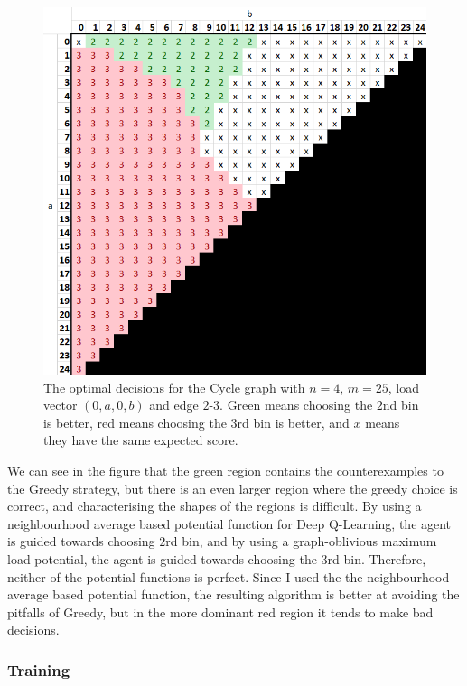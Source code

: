 \begin{figure}[h!] \label{greedy-counterexample-analysed}
    \centering
    \includegraphics[scale=1.0]{Chapter4/Figs/0a0b_4_25_analysis.png}
    \caption{The optimal decisions for the Cycle graph with $n=4$, $m=25$, load vector $(0,a,0,b)$ and edge $2$-$3$. Green means choosing the $2$nd bin is better, red means choosing the $3$rd bin is better, and $x$ means they have the same expected score.}
\end{figure}


We can see in the figure that the green region contains the counterexamples to the Greedy strategy, but there is an even larger region where the greedy choice is correct, and characterising the shapes of the regions is difficult. By using a neighbourhood average based potential function for Deep Q-Learning, the agent is guided towards choosing $2$rd bin, and by using a graph-oblivious maximum load potential, the agent is guided towards choosing the $3$rd bin. Therefore, neither of the potential functions is perfect. Since I used the the neighbourhood average based potential function, the resulting algorithm is better at avoiding the pitfalls of Greedy, but in the more dominant red region it tends to make bad decisions. 


\subsubsection{Training}

